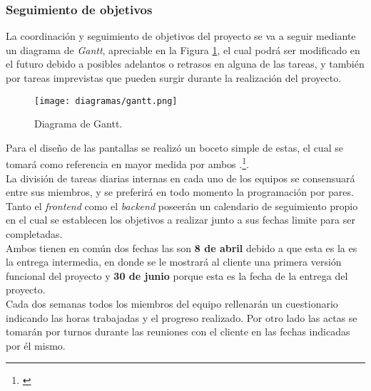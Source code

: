 \documentclass[11pt, a4paper, titlepage]{article}
\begin{document}
\subsubsection{Seguimiento de objetivos}
La coordinación y seguimiento de objetivos del proyecto se va a seguir mediante un diagrama de \textit{Gantt}, apreciable en la Figura \ref{fig:gantt}, el cual podrá ser modificado en el futuro debido a posibles adelantos o retrasos en alguna de las tareas, y también por tareas imprevistas que pueden surgir durante la realización del proyecto.\\

\begin{landscape}
    \pagestyle{empty}
    \begin{figure}[!p]
    \centering

    \texttt{[image: diagramas/gantt.png]}
    \caption{Diagrama de Gantt.}
    \label{fig:gantt}
\end{figure}
\end{landscape}

 Para el diseño de las pantallas se realizó un boceto simple de estas, el cual se tomará como referencia en mayor medida por ambos .\footnote{\href{https://github.com/UNIZAR-30226-2022-01/proyecto_software_documentacion/tree/main/imagenes}{}}.
\\

La división de tareas diarias internas en cada uno de los equipos se consensuará entre sus miembros, y se preferirá en todo momento la programación por pares.\\

Tanto el \textit{frontend} como el \textit{backend} poseerán un calendario de seguimiento propio en el cual se establecen los objetivos a realizar junto a sus fechas limite para ser completadas. \\

Ambos tienen en común dos fechas las son \textbf{8 de abril} debido a que esta es la es la entrega intermedia, en donde se le mostrará al cliente una primera versión funcional del proyecto
y \textbf{30 de junio} porque esta es la fecha de la entrega del proyecto.\\

Cada dos semanas todos los miembros del equipo rellenarán un cuestionario indicando las horas trabajadas y el progreso realizado. Por otro lado las actas se tomarán por turnos durante las reuniones con el cliente en las fechas indicadas por él mismo.\\
\end{document}
